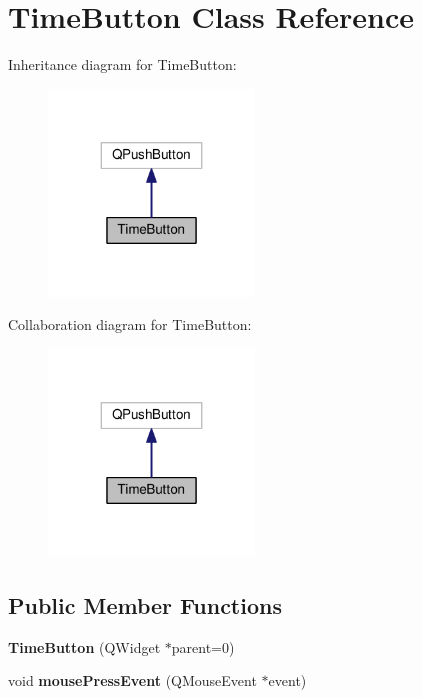 \hypertarget{class_time_button}{}\section{Time\+Button Class Reference}
\label{class_time_button}


Inheritance diagram for Time\+Button\+:
\nopagebreak
\begin{figure}[H]
\begin{center}
\leavevmode
\includegraphics[width=155pt]{class_time_button__inherit__graph}
\end{center}
\end{figure}


Collaboration diagram for Time\+Button\+:
\nopagebreak
\begin{figure}[H]
\begin{center}
\leavevmode
\includegraphics[width=155pt]{class_time_button__coll__graph}
\end{center}
\end{figure}
\subsection*{Public Member Functions}
\begin{DoxyCompactItemize}
\item 
{\bfseries Time\+Button} (Q\+Widget $\ast$parent=0)\hypertarget{class_time_button_a493107b549d7802550dc3e4d9d32fe2b}{}\label{class_time_button_a493107b549d7802550dc3e4d9d32fe2b}

\item 
void {\bfseries mouse\+Press\+Event} (Q\+Mouse\+Event $\ast$event)\hypertarget{class_time_button_afe68a85d9d1915cca4e85780eaceb96d}{}\label{class_time_button_afe68a85d9d1915cca4e85780eaceb96d}

\end{DoxyCompactItemize}



